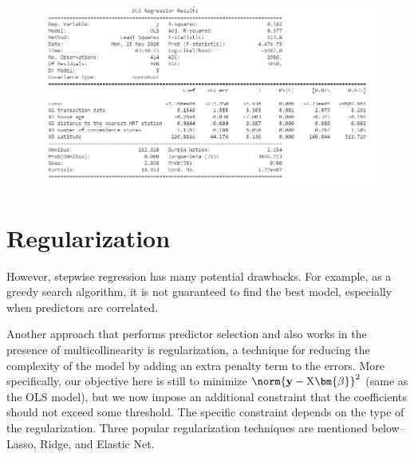 \documentclass{article}
\begin{document}
\begin{figure}[H]\includegraphics[width=\linewidth]{32}\end{figure}

\section*{Regularization}
However, stepwise regression has many potential drawbacks. For example, as a greedy search algorithm, it is not guaranteed to find the best model, especially when predictors are correlated.

Another approach that performs predictor selection and also works in the presence of multicollinearity is regularization, a technique for reducing the complexity of the model by adding an extra penalty term to the errors. More specifically, our objective here is still to minimize $\norm{\mathbf{y} - \text{X} \bm{\beta}}^2$ (same as the OLS model), but we now impose an additional constraint that the coefficients should not exceed some threshold. The specific constraint depends on the type of the regularization. Three popular regularization techniques are mentioned below--Lasso, Ridge, and Elastic Net.
\end{document}
